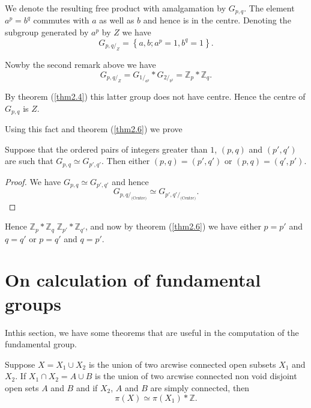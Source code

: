 We denote the resulting free product with amalgamation by
$G_{p,q}$. The element $a^p = b^q$ commutes with $a$ as well as $b$
and hence is in the centre. Denoting the subgroup generated by $a^p$
by $Z$ we have  
$$
G_{p,q /_{Z}} = \left\{ a,b; a^p = 1,  b^q = 1 \right\}.
$$

Now\pageoriginale by the second remark above we have 
$$
G_{p,q \bigg/_{Z}} = G_{1 \bigg/ _{a^p}}  \ast  G_{2  \bigg/_{b^q}}  =
\mathbb{Z}_p  \ast \mathbb{Z}_q. 
$$

\noindent
By theorem (\ref{thm2.4}) this latter group does not have centre. Hence the
centre of $G_{p,q}$ is $Z$. 

Using this fact and theorem (\ref{thm2.6}) we prove 

\setcounter{theorem}{8}
\begin{theorem}\label{thm2.9} %
 Suppose that the ordered pairs of integers greater than $1$, $(p,q)$
 and $(p', q')$ are such that  $G_{p,q} \simeq G_{p', q'}$. Then
 either $(p,q) = (p', q')$ or $(p,q) = (q', p')$. 
\end{theorem}

\begin{proof}
We have $G_{p,q} \simeq G_{p', q'}$ and hence
$$
G_{p,q /_{\text{(Centre)}}} \simeq G_{p', q' / _{\text{(Centre)}}}. 
$$
\end{proof}

Hence $\mathbb{Z}_p \ast \mathbb{Z}_{q} \;  \mathbb{Z}_{p'} \ast
\mathbb{Z}_{q'}$, and now by theorem (\ref{thm2.6}) we have either $p =p'$ and
$q =q'$ or $p= q'$ and $q=p'$. 


\section{On calculation of fundamental groups}\label{sec3} %

In\pageoriginale this section, we have some theorems that are useful
in the computation of the fundamental group.  


\begin{theorem}\label{thm3.1}%
Suppose $X = X_1 \cup X_2$ is the union of two arcwise connected
  open subsets $X_1$ and $X_2$. If  $X_1 \cap X_2 = A \cup B$ is the
  union of two arcwise connected non void disjoint open sets $A$ and
  $B$ and if $X_2$, $A$ and $B$ are simply connected, then 
$$
\pi (X) \simeq \pi (X_1) \ast \mathbb{Z}.
$$
 \end{theorem} 
 

